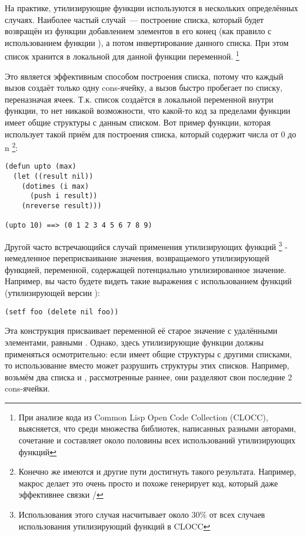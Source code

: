 На практике, утилизирующие функции используются в нескольких определённых
случаях. Наиболее частый случай~--- построение списка, который будет возвращён из функции
добавлением элементов в его конец (как правило с использованием функции ), а
потом инвертирование данного списка. При этом список хранится в локальной для данной
функции переменной. \footnote{При анализе кода из Common Lisp Open Code Collection
  (CLOCC), выясняется, что среди множества библиотек, написанных разными авторами,
  сочетание  и  составляет около половины всех использований
  утилизирующих функций}

Это является эффективным способом построения списка, потому что каждый вызов 
создаёт только одну cons-ячейку, а вызов  быстро пробегает по списку,
переназначая  ячеек. Т.к. список создаётся в локальной переменной внутри
функции, то нет никакой возможности, что какой-то код за пределами функции имеет общие
структуры с данным списком. Вот пример функции, которая использует такой приём для
построения списка, который содержит числа от 0 до n \footnote{Конечно же имеются и другие
  пути достигнуть такого результата. Например, макрос  делает это очень просто
  и похоже генерирует код, который даже эффективнее связки /}:

\begin{lstlisting}
(defun upto (max)
  (let ((result nil))
    (dotimes (i max)
      (push i result))
    (nreverse result)))

(upto 10) ==> (0 1 2 3 4 5 6 7 8 9)
\end{lstlisting}

Другой часто встречающийся случай применения утилизирующих функций \footnote{Использования
  этого случая насчитывает около 30\% от всех случаев использования утилизирующий функций
  в CLOCC} - немедленное переприсваивание значения, возвращаемого утилизирующей функцией,
переменной, содержащей потенциально утилизированное значение. Например, вы часто будете
видеть такие выражения с использованием функций  (утилизирующей версии
):

\begin{lstlisting}
(setf foo (delete nil foo))
\end{lstlisting}

Эта конструкция присваивает переменной  её старое значение с удалёнными
элементами, равными . Однако, здесь утилизирующие функции должны применяться
осмотрительно: если  имеет общие структуры с другими списками, то использование
 вместо  может разрушить структуры этих списков. Например,
возьмём два списка  и , рассмотренные раннее, они разделяют свои
последние 2 cons-ячейки.

